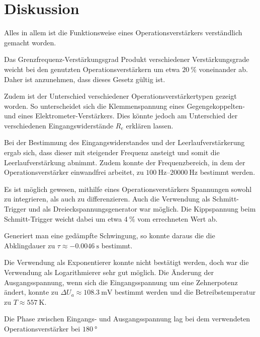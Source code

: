 \section{Diskussion}
\label{sec:diskussion}

Alles in allem ist die Funktionsweise eines Operationsverstärkers verständlich gemacht worden.

Das Grenzfrequenz-Verstärkungsgrad Produkt verschiedener Verstärkungsgrade weicht bei den genutzten Operationsverstärkern um etwa $\SI{20}{\percent}$ voneinander ab.
Daher ist anzunehmen, dass dieses Gesetz gültig ist.

Zudem ist der Unterschied verschiedener Operationsverstärkertypen gezeigt worden.
So unterscheidet sich die Klemmenspannung eines Gegengekoppelten- und eines Elektrometer-Verstärkers.
Dies könnte jedoch am Unterschied der verschiedenen Eingangswiderstände $R_e$ erklären lassen.

Bei der Bestimmung des Eingangswiderstandes und der Leerlaufverstärkerung ergab sich, dass dieser mit steigender Frequenz ansteigt und somit die Leerlaufverstärkung abnimmt.
Zudem konnte der Frequenzbereich, in dem der Operationsverstärker einwandfrei arbeitet, zu $\SIrange{100}{20000}{\hertz}$ bestimmt werden.

Es ist möglich gewesen, mithilfe eines Operationsverstärkers Spannungen sowohl zu integrieren, als auch zu differenzieren.
Auch die Verwendung als Schmitt-Trigger und als Dreieckspannungsgenerator war möglich.
Die Kippspannung beim Schmitt-Trigger weicht dabei um etwa $\SI{4}{\percent}$ vom errechneten Wert ab.

Generiert man eine gedämpfte Schwingung, so konnte daraus die die Abklingdauer zu $\tau \approx \SI{-0.0046}{\second}$ bestimmt.

Die Verwendung als Exponentierer konnte nicht bestätigt werden, doch war die Verwendung als Logarithmierer sehr gut möglich. 
Die Änderung der Ausgangsspannung, wenn sich die Eingangsspannung um eine Zehnerpotenz ändert, konnte zu $\Delta U_a \approx \SI{108.3}{\milli\volt}$ bestimmt werden und die Betreibstemperatur zu $T \approx \SI{557}{\kelvin}$.

Die Phase zwischen Eingangs- und Ausgangsspannung lag bei dem verwendeten Operationsverstärker bei $\SI{180}{\degree}$